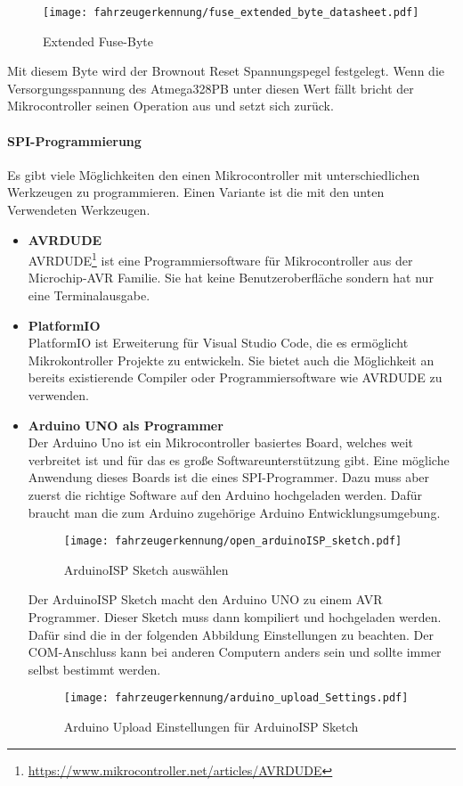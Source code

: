 \begin{figure}[H]
    \centering
    \texttt{[image: fahrzeugerkennung/fuse\_extended\_byte\_datasheet.pdf]}
    \caption{Extended Fuse-Byte}
\end{figure}

Mit diesem Byte wird der Brownout Reset Spannungspegel festgelegt. Wenn die Versorgungsspannung des Atmega328PB unter diesen Wert fällt bricht der Mikrocontroller seinen Operation aus und setzt sich zurück.


\paragraph{SPI-Programmierung}\mbox{} 

Es gibt viele Möglichkeiten den einen Mikrocontroller mit unterschiedlichen Werkzeugen zu programmieren. Einen Variante ist die mit den unten Verwendeten Werkzeugen.

\begin{itemize}
    \item \textbf{AVRDUDE} \\
    AVRDUDE\footnote{\url{https://www.mikrocontroller.net/articles/AVRDUDE}} ist eine Programmiersoftware für Mikrocontroller aus der Microchip-AVR Familie. Sie hat keine Benutzeroberfläche sondern hat nur eine Terminalausgabe.
    \item \textbf{PlatformIO} \\
    PlatformIO ist Erweiterung für Visual Studio Code, die es ermöglicht Mikrokontroller Projekte zu entwickeln. Sie bietet auch die Möglichkeit an bereits existierende Compiler oder Programmiersoftware wie AVRDUDE zu verwenden.
    \item \textbf{Arduino UNO als Programmer} \\
    Der Arduino Uno ist ein Mikrocontroller basiertes Board, welches weit verbreitet ist und für das es große Softwareunterstützung gibt. Eine mögliche Anwendung dieses Boards ist die eines SPI-Programmer. 
    Dazu muss aber zuerst die richtige Software auf den Arduino hochgeladen werden. Dafür braucht man die zum Arduino zugehörige Arduino Entwicklungsumgebung.
    \begin{figure}[H]
        \centering
        \texttt{[image: fahrzeugerkennung/open\_arduinoISP\_sketch.pdf]}
        \caption{ArduinoISP Sketch auswählen}
    \end{figure}
    Der ArduinoISP Sketch macht den Arduino UNO zu einem AVR Programmer. Dieser Sketch muss dann kompiliert und hochgeladen werden. Dafür sind die in der folgenden Abbildung Einstellungen zu beachten. Der COM-Anschluss kann
    bei anderen Computern anders sein und sollte immer selbst bestimmt werden. 
    \begin{figure}[H]
        \centering
        \texttt{[image: fahrzeugerkennung/arduino\_upload\_Settings.pdf]}
        \caption{Arduino Upload Einstellungen für ArduinoISP Sketch}
    \end{figure}
\end{itemize}

